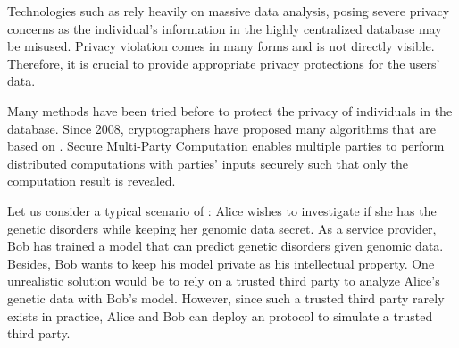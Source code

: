 




Technologies such as \machinelearning rely heavily on massive data analysis, posing severe privacy concerns as the individual's information in the highly centralized database may be misused. Privacy violation comes in many forms and is not directly visible. Therefore, it is crucial to provide appropriate privacy protections for the users' data.

Many methods have been tried before to protect the privacy of individuals in the database.
Since 2008, cryptographers have proposed many \ppml algorithms that are based on \smpc. Secure Multi-Party Computation enables multiple parties to perform distributed computations with parties' inputs securely such that only the computation result is revealed.

Let us consider a typical scenario of \ppml: Alice wishes to investigate if she has the genetic disorders while keeping her genomic data secret. As a service provider, Bob has trained a \machinelearning model that can predict genetic disorders given genomic data. Besides, Bob wants to keep his \machinelearning model private as his intellectual property. One unrealistic solution would be to rely on a trusted third party to analyze Alice's genetic data with Bob's \machinelearning model. However, since such a trusted third party rarely exists in practice, Alice and Bob can deploy an \smpc protocol to simulate a trusted third party.

